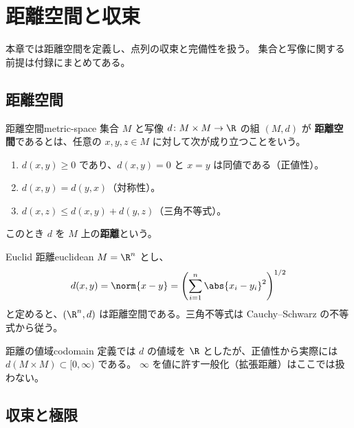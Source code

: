 
\chapter{距離空間と収束}
\label{ch:introduction}

本章では距離空間を定義し、点列の収束と完備性を扱う。
集合と写像に関する前提は付録にまとめてある。

\section{距離空間}
\label{sec:metric-space}

\begin{definition}{距離空間}{metric-space}
集合 $M$ と写像 $d \colon M \times M \to \R$ の組 $(M, d)$ が
\textbf{距離空間}であるとは、任意の $x, y, z \in M$ に対して次が成り立つことをいう。
\begin{enumerate}
  \item $d(x, y) \geq 0$ であり、$d(x, y) = 0$ と $x = y$ は同値である（正値性）。
  \item $d(x, y) = d(y, x)$（対称性）。
  \item $d(x, z) \leq d(x, y) + d(y, z)$（三角不等式）。
\end{enumerate}
このとき $d$ を $M$ 上の\textbf{距離}という。
\end{definition}

\begin{example}{Euclid 距離}{euclidean}
$M = \R^n$ とし、
\[
  d(x, y) = \norm{x - y} = \left( \sum_{i=1}^{n} \abs{x_i - y_i}^2 \right)^{1/2}
\]
と定めると、$(\R^n, d)$ は距離空間である。三角不等式は Cauchy--Schwarz の不等式から従う。
\end{example}

\begin{remark}{距離の値域}{codomain}
定義では $d$ の値域を $\R$ としたが、正値性から実際には $d(M \times M) \subset [0, \infty)$ である。
$\infty$ を値に許す一般化（拡張距離）はここでは扱わない。
\end{remark}

\section{収束と極限}
\label{sec:convergence}

